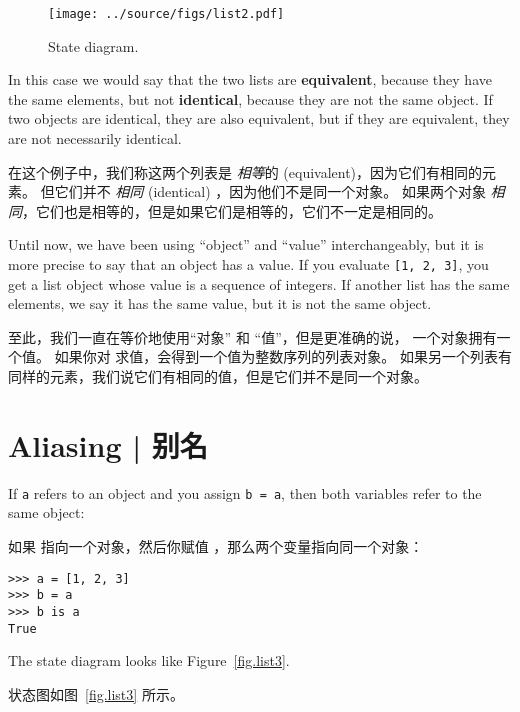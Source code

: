   

\begin{figure}
\centerline
{\texttt{[image: ../source/figs/list2.pdf]}}
\caption{State diagram.}
\label{fig.list2}
\end{figure}

In this case we would say that the two lists are {\bf equivalent},
because they have the same elements, but not {\bf identical}, because
they are not the same object.  If two objects are identical, they are
also equivalent, but if they are equivalent, they are not necessarily
identical.

在这个例子中，我们称这两个列表是 {\em 相等}的 (equivalent)，因为它们有相同的元素。 但它们并不 {\em 相同} (identical) ，因为他们不是同一个对象。 如果两个对象 {\em 相同}，它们也是相等的，但是如果它们是相等的，它们不一定是相同的。

  

Until now, we have been using ``object'' and ``value''
interchangeably, but it is more precise to say that an object has a
value.  If you evaluate {\tt [1, 2, 3]}, you get a list
object whose value is a sequence of integers.  If another
list has the same elements, we say it has the same value, but
it is not the same object.

至此，我们一直在等价地使用``对象'' 和 ``值''，但是更准确的说， 一个对象拥有一个值。 如果你对 \li{[1, 2, 3]} 求值，会得到一个值为整数序列的列表对象。
如果另一个列表有同样的元素，我们说它们有相同的值，但是它们并不是同一个对象。

  


\section{Aliasing  |  别名}
  

If {\tt a} refers to an object and you assign {\tt b = a},
then both variables refer to the same object:

如果  指向一个对象，然后你赋值  ，那么两个变量指向同一个对象：

\begin{lstlisting}
>>> a = [1, 2, 3]
>>> b = a
>>> b is a
True
\end{lstlisting}

%
The state diagram looks like Figure~\ref{fig.list3}.

状态图如图~\ref{fig.list3} 所示。

